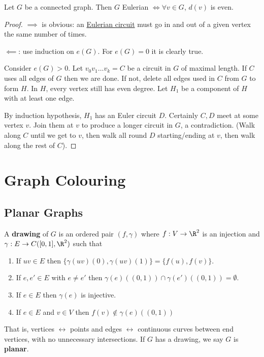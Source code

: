 \documentclass{article}
\begin{document}
\begin{nprop}\label{thm:18}
    Let $G$ be a connected graph. Then $G$ Eulerian $\iff \forall v \in G$, $d(v)$ is even.
\end{nprop}

\begin{proof}
    $\implies$ is obvious: an \hyperlink{def:euler}{Eulerian circuit} must go in and out of a given vertex the same number of times.

    $\impliedby$: use induction on $e(G)$. For $e(G) = 0$ it is clearly true.

    Consider $e(G) > 0$. Let $v_0 v_1 \dotsc v_k = C$ be a circuit in $G$ of maximal length. If $C$ uses all edges of $G$ then we are done.
    If not, delete all edges used in $C$ from $G$ to form $H$.
    In $H$, every vertex still has even degree. Let $H_1$ be a component of $H$ with at least one edge.

    By induction hypothesis, $H_1$ has an Euler circuit $D$.
    Certainly $C, D$ meet at some vertex $v$.
    Join them at $v$ to produce a longer circuit in $G$, a contradiction.
    (Walk along $C$ until we get to $v$, then walk all round $D$ starting/ending at $v$, then walk along the rest of $C$).
\end{proof}

\clearpage
\section{Graph Colouring}


\subsection{Planar Graphs}
\begin{defi}
    A \textbf{drawing} of $G$ is an ordered pair $(f, \gamma)$ where $f: V \to \R^2$ is an injection and $\gamma: E \to C([0, 1], \R^2)$ such that
    \begin{enumerate}[label=(\roman*)]
        \item If $uv \in E$ then $\{\gamma(uv)(0), \gamma(uv)(1)\} = \{f(u), f(v)\}$.
        \item If $e, e' \in E$ with $e \neq e'$ then $\gamma(e)((0, 1)) \cap \gamma(e')((0,1)) = \emptyset$.
        \item If $e \in E$ then $\gamma(e)$ is injective.
        \item If $e \in E$ and $v \in V$ then $f(v) \notin \gamma(e)((0, 1))$
    \end{enumerate}
    That is, vertices $\leftrightarrow$ points and edges $\leftrightarrow$ continuous curves between end vertices, with no unnecessary intersections.
    If $G$ has a drawing, we say $G$ is \textbf{planar}.
\end{defi}
\end{document}
